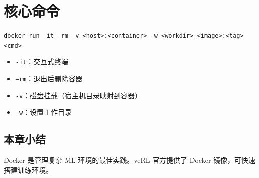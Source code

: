 \section{核心命令}
\texttt{docker run -it --rm -v <host>:<container> -w <workdir> <image>:<tag> <cmd>}
\begin{itemize}
  \item \texttt{-it}：交互式终端
  \item \texttt{--rm}：退出后删除容器
  \item \texttt{-v}：磁盘挂载（宿主机目录映射到容器）
  \item \texttt{-w}：设置工作目录
\end{itemize}

\subsection{本章小结}
Docker 是管理复杂 ML 环境的最佳实践。veRL 官方提供了 Docker 镜像，可快速搭建训练环境。

\newpage
